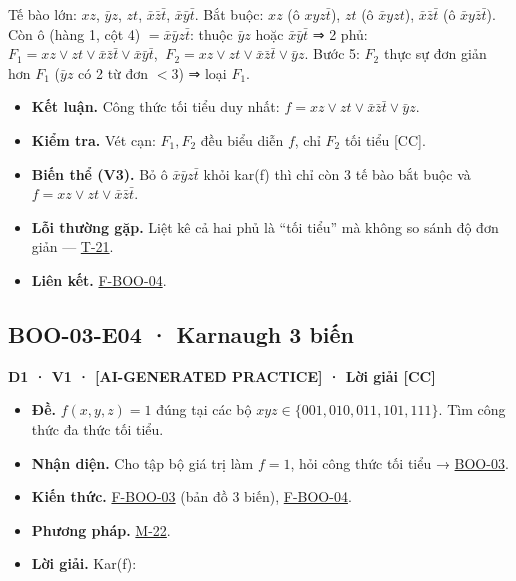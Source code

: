 \documentclass[
  10pt,
  twoside,openany]{book}
\providecommand{\tightlist}{%
  \setlength{\itemsep}{0pt}\setlength{\parskip}{0pt}}
\begin{document}
Tế bào lớn: \(xz\), \(\bar yz\), \(zt\), \(\bar x\bar z\bar t\),
\(\bar x\bar y\bar t\). Bắt buộc: \(xz\) (ô \(xyz\bar t\)), \(zt\) (ô
\(\bar xyzt\)), \(\bar x\bar z\bar t\) (ô \(\bar xy\bar z\bar t\)). Còn
ô (hàng 1, cột 4) \(=\bar x\bar yz\bar t\): thuộc \(\bar yz\) hoặc
\(\bar x\bar y\bar t\) ⇒ 2 phủ:
\(F_1=xz\vee zt\vee\bar x\bar z\bar t\vee\bar x\bar y\bar t\),
\(\ F_2=xz\vee zt\vee\bar x\bar z\bar t\vee\bar yz\). Bước 5: \(F_2\)
thực sự đơn giản hơn \(F_1\) (\(\bar yz\) có 2 từ đơn \(<3\)) ⇒ loại
\(F_1\).

\begin{itemize}
\tightlist
\item
  \textbf{Kết luận.} Công thức tối tiểu duy nhất:
  \(f=xz\vee zt\vee\bar x\bar z\bar t\vee\bar yz\).
\item
  \textbf{Kiểm tra.} Vét cạn: \(F_1,F_2\) đều biểu diễn \(f\), chỉ
  \(F_2\) tối tiểu {[}CC{]}.
\item
  \textbf{Biến thể (V3).} Bỏ ô \(\bar x\bar yz\bar t\) khỏi kar(f) thì
  chỉ còn 3 tế bào bắt buộc và \(f=xz\vee zt\vee\bar x\bar z\bar t\).
\item
  \textbf{Lỗi thường gặp.} Liệt kê cả hai phủ là ``tối tiểu'' mà không
  so sánh độ đơn giản --- \protect\hyperlink{T-21}{T-21}.
\item
  \textbf{Liên kết.} \protect\hyperlink{F-BOO-04}{F-BOO-04}.
\end{itemize}

\hypertarget{BOO-03-E04}{%
\subsection{BOO-03-E04 · Karnaugh 3 biến}\label{BOO-03-E04}}

\textbf{D1 · V1 · {[}AI-GENERATED PRACTICE{]} · Lời giải {[}CC{]}}

\begin{itemize}
\tightlist
\item
  \textbf{Đề.} \(f(x,y,z)=1\) đúng tại các bộ
  \(xyz\in\{001,010,011,101,111\}\). Tìm công thức đa thức tối tiểu.
\item
  \textbf{Nhận diện.} Cho tập bộ giá trị làm \(f=1\), hỏi công thức tối
  tiểu → \protect\hyperlink{BOO-03}{BOO-03}.
\item
  \textbf{Kiến thức.} \protect\hyperlink{F-BOO-03}{F-BOO-03} (bản đồ 3
  biến), \protect\hyperlink{F-BOO-04}{F-BOO-04}.
\item
  \textbf{Phương pháp.} \protect\hyperlink{M-22}{M-22}.
\item
  \textbf{Lời giải.} Kar(f):
\end{itemize}
\end{document}
